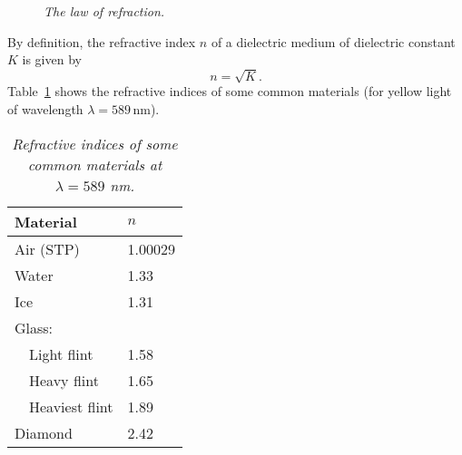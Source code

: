 \begin{figure}
\epsfysize=3in
\centerline{}
\caption{\em The law of refraction.}\label{f12.5}
\end{figure}

By definition, the refractive index $n$ of a dielectric medium
of dielectric constant $K$ is given by
\begin{equation}
n = \sqrt{K}.
\end{equation}
Table~\ref{t12.1} shows the refractive indices of some common 
materials (for yellow light of wavelength $\lambda= 589$\,nm). 
\begin{table}
\begin{tabular}{ll}\hline
Material & $n$ \\[0.5ex] \hline
Air (STP) & 1.00029\\
Water & 1.33 \\
Ice & 1.31\\
Glass: &\\
~~Light flint & 1.58\\
~~Heavy flint & 1.65\\
~~Heaviest flint & 1.89\\
Diamond & 2.42\\ 
\end{tabular}
\centering
\caption{\em Refractive indices of some common materials at $\lambda=589$ nm.}\label{t12.1}
\end{table}

